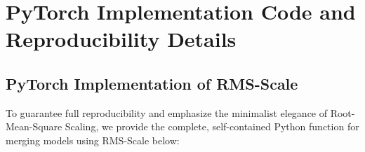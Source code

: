 \documentclass{article}
\theoremstyle{plain}
\theoremstyle{definition}
\theoremstyle{remark}
\begin{document}







\newpage



\newpage
\appendix
\onecolumn
\section{PyTorch Implementation Code and Reproducibility Details}
\label{submission:sec:appendix_code}

\subsection{PyTorch Implementation of RMS-Scale}
To guarantee full reproducibility and emphasize the minimalist elegance of Root-Mean-Square Scaling, we provide the complete, self-contained Python function for merging models using RMS-Scale below:
\end{document}
